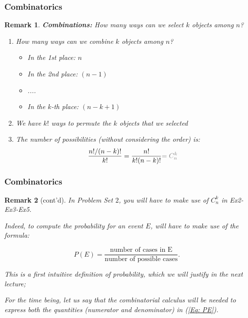\documentclass[notes=show, handout]{beamer}\usepackage[]{graphicx}\usepackage[]{color}
\newtheorem{remark}{Remark}[section]
\begin{document}
\begin{frame}
\frametitle{Combinatorics}

\begin{remark}
\textbf{Combinations:} How many ways can we select $k$ objects among $n$?
\begin{enumerate}
\item How many ways can we combine $k$ objects among $n$?
\begin{itemize}
\item In the 1st place: $n$
\item In the 2nd place: $(n-1)$
\item ....
\item In the $k$-th place: $(n-k+1)$
\end{itemize}

\item We have $k!$ ways to permute the $k$ objects that we selected
\item The number of possibilities (without considering the order) is:
$$
\frac{n!/(n-k)!}{k!} = \frac{n!}{k!(n-k)!} \color{gray}{=C^{k}_n}\color{black}
$$
\end{enumerate}
\end{remark}

\end{frame}

\begin{frame}
\frametitle{Combinatorics}

\begin{remark} [cont'd]

In Problem Set $2$, you will have to make use of $C^{k}_n$ in Ex2-Ex3-Ex5.

Indeed, to compute the probability for an event $E$, will have to make use of the formula:

\begin{equation} \label{Eq: PE}
P(E)=\dfrac{\text{number of cases in E}}{\text{number of possible cases}}.
\end{equation}

This is a first intuitive definition of probability, which we will justify in the next lecture;

For the time being, let us say that the combinatorial calculus will be needed to express both the quantities (numerator and denominator) in (\ref{Eq: PE}).

\end{remark}

\end{frame}
\end{document}
